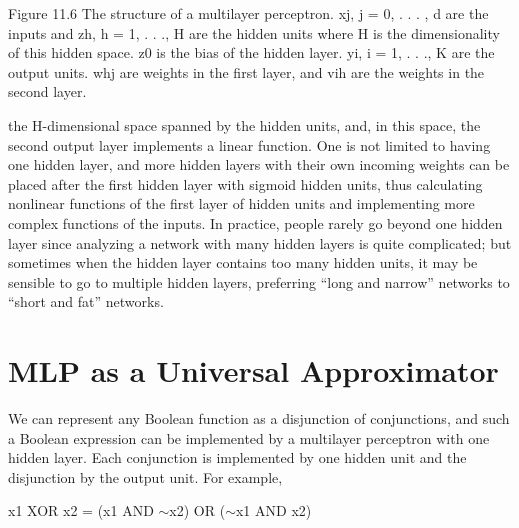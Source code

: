 Figure 11.6 The structure of a multilayer perceptron. xj, j = 0, . . . , d are the inputs and zh, h = 1, . . ., H are the hidden units where H is the dimensionality of this hidden space. z0 is the bias of the hidden layer. yi, i = 1, . . ., K are the output units. whj are weights in the first layer, and vih are the weights in the second layer.

the H-dimensional space spanned by the hidden units, and, in this space, the second output layer implements a linear function. One is not limited to having one hidden layer, and more hidden layers with their own incoming weights can be placed after the first hidden layer with sigmoid hidden units, thus calculating nonlinear functions of the first layer of hidden units and implementing more complex functions of the inputs. In practice, people rarely go beyond one hidden layer since analyzing a network with many hidden layers is quite complicated; but sometimes when the hidden layer contains too many hidden units, it may be sensible to go to multiple hidden layers, preferring “long and narrow” networks to “short and fat” networks.

\section{MLP as a Universal Approximator}

We can represent any Boolean function as a disjunction of conjunctions, and such a Boolean expression can be implemented by a multilayer perceptron with one hidden layer. Each conjunction is implemented by one hidden unit and the disjunction by the output unit. For example,

x1 XOR x2 = (x1 AND $\sim$x2) OR ($\sim$x1 AND x2)

